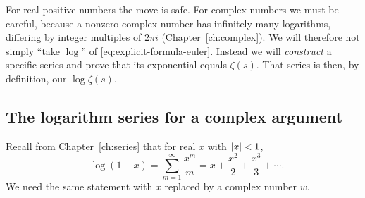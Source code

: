 For real positive numbers the move is safe. For complex numbers we must be careful, because a nonzero complex number has infinitely many logarithms, differing by integer multiples of $2\pi i$ (Chapter~\ref{ch:complex}). We will therefore not simply ``take $\log$'' of \cref{eq:explicit-formula-euler}. Instead we will \emph{construct} a specific series and prove that its exponential equals $\zeta(s)$. That series is then, by definition, our $\log\zeta(s)$.

\subsection{The logarithm series for a complex argument}

Recall from Chapter~\ref{ch:series} that for real $x$ with $\left\lvert x\right\rvert<1$,
\begin{equation}
-\log(1-x)=\sum_{m=1}^{\infty}\frac{x^{m}}{m}=x+\frac{x^{2}}{2}+\frac{x^{3}}{3}+\cdots .
\label{eq:explicit-formula-logreal}
\end{equation}
We need the same statement with $x$ replaced by a complex number $w$.

